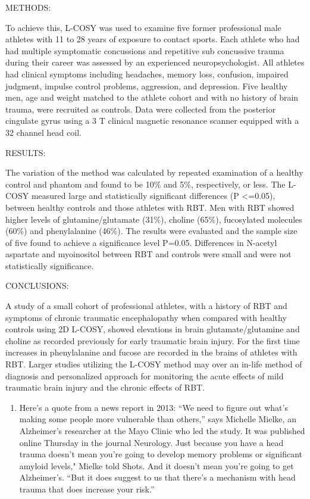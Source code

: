 \documentclass[
]{report}
\providecommand{\tightlist}{%
  \setlength{\itemsep}{0pt}\setlength{\parskip}{0pt}}
\begin{document}
METHODS:

To achieve this, L-COSY was used to examine five former professional male athletes with 11 to 28 years of exposure to contact sports. Each athlete who had had multiple symptomatic concussions and repetitive sub concussive trauma during their career was assessed by an experienced neuropsychologist. All athletes had clinical symptoms including headaches, memory loss, confusion, impaired judgment, impulse control problems, aggression, and depression. Five healthy men, age and weight matched to the athlete cohort and with no history of brain trauma, were recruited as controls. Data were collected from the posterior cingulate gyrus using a 3 T clinical magnetic resonance scanner equipped with a 32 channel head coil.

RESULTS:

The variation of the method was calculated by repeated examination of a healthy control and phantom and found to be 10\% and 5\%, respectively, or less. The L-COSY measured large and statistically significant differences (P \textless=0.05), between healthy controls and those athletes with RBT. Men with RBT showed higher levels of glutamine/glutamate (31\%), choline (65\%), fucosylated molecules (60\%) and phenylalanine (46\%). The results were evaluated and the sample size of five found to achieve a significance level P=0.05. Differences in N-acetyl aspartate and myoinositol between RBT and controls were small and were not statistically significance.

CONCLUSIONS:

A study of a small cohort of professional athletes, with a history of RBT and symptoms of chronic traumatic encephalopathy when compared with healthy controls using 2D L-COSY, showed elevations in brain glutamate/glutamine and choline as recorded previously for early traumatic brain injury. For the first time increases in phenylalanine and fucose are recorded in the brains of athletes with RBT. Larger studies utilizing the L-COSY method may over an in-life method of diagnosis and personalized approach for monitoring the acute effects of mild traumatic brain injury and the chronic effects of RBT.

\begin{enumerate}
\def\labelenumi{\arabic{enumi}.}
\setcounter{enumi}{2}
\tightlist
\item
  Here's a quote from a news report in 2013:
  ``We need to figure out what's making some people more vulnerable than others,'' says Michelle Mielke, an Alzheimer's researcher at the Mayo Clinic who led the study. It was published online Thursday in the journal Neurology. Just because you have a head trauma doesn't mean you're going to develop memory problems or significant amyloid levels," Mielke told Shots. And it doesn't
  mean you're going to get Alzheimer's. ``But it does suggest to us that there's a mechanism with head trauma that does increase your risk.''
\end{enumerate}
\end{document}
